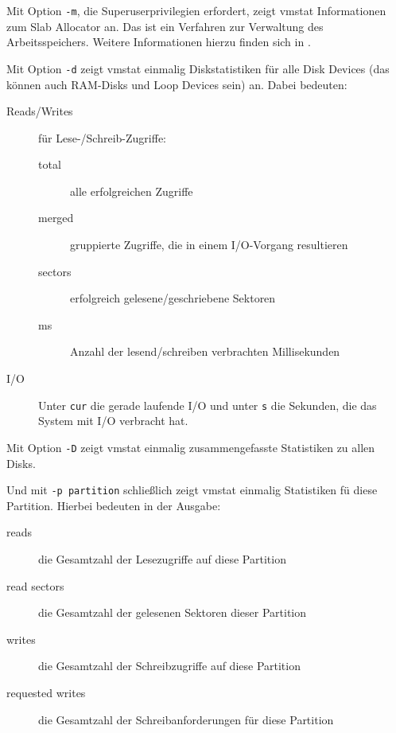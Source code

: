 \begin{normaltext}
  Mit Option \verb?-m?, die Superuserprivilegien erfordert, zeigt vmstat
  Informationen zum Slab Allocator an. Das ist ein Verfahren zur Verwaltung
  des Arbeitsspeichers. Weitere Informationen hierzu finden sich in
  \cite{Bonwick:1994:SAO:1267257.1267263}.

  Mit Option \verb?-d? zeigt vmstat einmalig Diskstatistiken für alle Disk
  Devices (das können auch RAM-Disks und Loop Devices sein) an.
  Dabei bedeuten:
  \begin{description}
    \item[Reads/Writes] für Lese-/Schreib-Zugriffe:
      \begin{description}
        \item[total] alle erfolgreichen Zugriffe
        \item[merged] gruppierte Zugriffe, die in einem I/O-Vorgang resultieren
        \item[sectors] erfolgreich gelesene/geschriebene Sektoren
        \item[ms] Anzahl der lesend/schreiben verbrachten Millisekunden
      \end{description}
    \item[I/O] Unter \verb?cur? die gerade laufende I/O und unter \verb?s? die
      Sekunden, die das System mit I/O verbracht hat.
  \end{description}

  Mit Option \verb?-D? zeigt vmstat einmalig zusammengefasste Statistiken zu
  allen Disks.

  Und mit \verb?-p partition? schließlich zeigt vmstat einmalig Statistiken fü
  diese Partition. Hierbei bedeuten in der Ausgabe:
  \begin{description}
    \item[reads] die Gesamtzahl der Lesezugriffe auf diese Partition
    \item[read sectors] die Gesamtzahl der gelesenen Sektoren dieser Partition
    \item[writes] die Gesamtzahl der Schreibzugriffe auf diese Partition
    \item[requested writes] die Gesamtzahl der Schreibanforderungen für diese
      Partition
  \end{description}
\end{normaltext}

